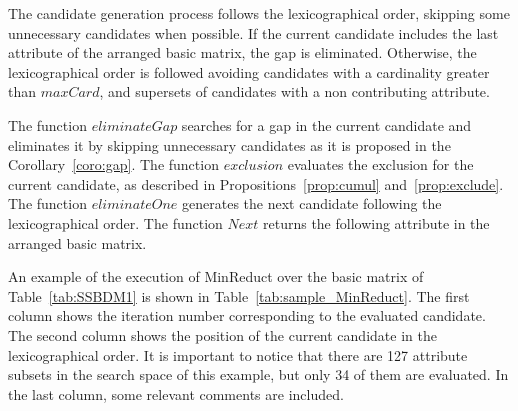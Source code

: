 \documentclass[authoryear,preprint,review,12pt]{elsarticle}
\begin{document}
	The candidate generation process follows the lexicographical order, skipping some unnecessary candidates when possible. If the current candidate includes the last attribute of the arranged basic matrix, the gap is eliminated. Otherwise, the lexicographical order is followed avoiding candidates with a cardinality greater than $maxCard$, and supersets of candidates with a non contributing attribute.
	
	The function $eliminateGap$ searches for a gap in the current candidate and eliminates it by skipping unnecessary candidates as it is proposed in the Corollary~\ref{coro:gap}. The function $exclusion$ evaluates the exclusion for the current candidate, as described in Propositions~\ref{prop:cumul} and~\ref{prop:exclude}. The function $eliminateOne$ generates the next candidate following the lexicographical order. The function $Next$ returns the following attribute in the arranged basic matrix.
		
	An example of the execution of MinReduct over the basic matrix of Table~\ref{tab:SSBDM1} is shown in Table~\ref{tab:sample_MinReduct}. The first column shows the iteration number corresponding to the evaluated candidate. The second column shows the position of the current candidate in the lexicographical order. It is important to notice that there are 127 attribute subsets in the search space of this example, but only 34 of them are evaluated. In the last column, some relevant comments are included.
\end{document}
